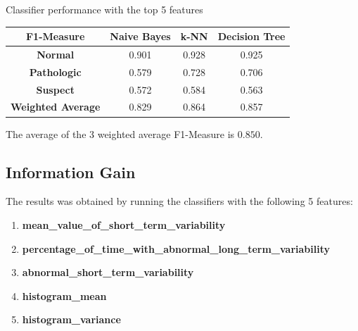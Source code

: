 \documentclass[12pt]{article}
\begin{document}
\begin{section}{Classifier performance with the top 5 features}
 \begin{center}
     \begin{tabular}{| c | c | c | c |}
         \hline
         \textbf{F1-Measure}       & \textbf{Naive Bayes} & \textbf{k-NN} & \textbf{Decision Tree} \\ [0.5ex]
         \hline
         \textbf{Normal}           & 0.901                & 0.928         & 0.925                  \\
         \hline
         \textbf{Pathologic}       & 0.579                & 0.728         & 0.706                  \\
         \hline
         \textbf{Suspect}          & 0.572                & 0.584         & 0.563                  \\
         \hline
         \hline
         \textbf{Weighted Average} & 0.829                & 0.864         & 0.857                  \\
         \hline
     \end{tabular}
 \end{center}

 The average of the 3 weighted average F1-Measure is $0.850$.

 \subsection{Information Gain}
 The results was obtained by running the classifiers with the following 5 features:
 \begin{enumerate}
     \item \textbf{mean\_value\_of\_short\_term\_variability}
     \item \textbf{percentage\_of\_time\_with\_abnormal\_long\_term\_variability}
     \item \textbf{abnormal\_short\_term\_variability}
     \item \textbf{histogram\_mean}
     \item \textbf{histogram\_variance}
 \end{enumerate}


\end{section}
\end{document}
